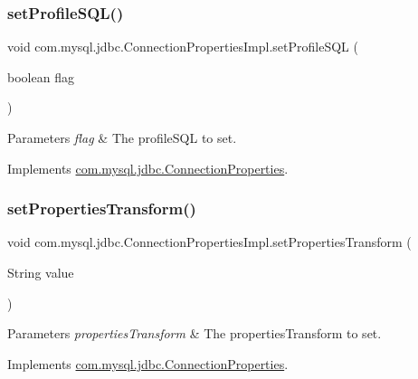 \subsubsection{\texorpdfstring{set\+Profile\+S\+Q\+L()}{setProfileSQL()}}
{\footnotesize\ttfamily void com.\+mysql.\+jdbc.\+Connection\+Properties\+Impl.\+set\+Profile\+S\+QL (\begin{DoxyParamCaption}\item[{boolean}]{flag }\end{DoxyParamCaption})}


\begin{DoxyParams}{Parameters}
{\em flag} & The profile\+S\+QL to set. \\
\hline
\end{DoxyParams}


Implements \mbox{\hyperlink{interfacecom_1_1mysql_1_1jdbc_1_1_connection_properties_a6c91e5a3250a313eee67f7174599be99}{com.\+mysql.\+jdbc.\+Connection\+Properties}}.

\mbox{\label{classcom_1_1mysql_1_1jdbc_1_1_connection_properties_impl_a93084da20cac3293dc418ae1c9c8cb74}} 
\subsubsection{\texorpdfstring{set\+Properties\+Transform()}{setPropertiesTransform()}}
{\footnotesize\ttfamily void com.\+mysql.\+jdbc.\+Connection\+Properties\+Impl.\+set\+Properties\+Transform (\begin{DoxyParamCaption}\item[{String}]{value }\end{DoxyParamCaption})}


\begin{DoxyParams}{Parameters}
{\em properties\+Transform} & The properties\+Transform to set. \\
\hline
\end{DoxyParams}


Implements \mbox{\hyperlink{interfacecom_1_1mysql_1_1jdbc_1_1_connection_properties_a999fc9432437c9bf822f8e3ea6f03ce9}{com.\+mysql.\+jdbc.\+Connection\+Properties}}.

